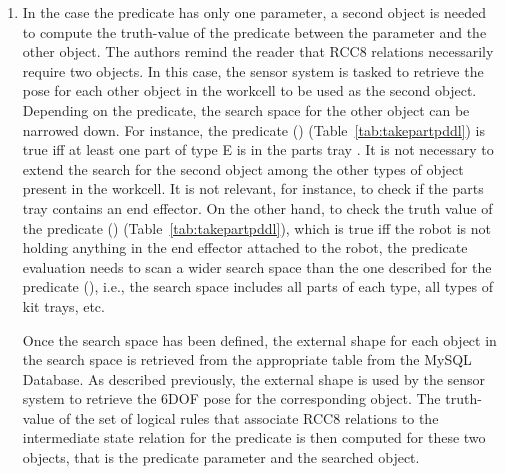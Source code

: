 \begin{enumerate}
\item In the case the predicate has only one parameter, a second object is needed to compute the truth-value of the predicate between the parameter and the other object. The authors remind the reader that RCC8 relations necessarily require two objects. In this case, the sensor system is tasked to retrieve the pose for each other object in the workcell to be used as the second object. Depending on the predicate, the search space for the other object can be narrowed down. For instance, the predicate () (Table~\ref{tab:takepartpddl}) is true iff at least one part of type E is in the parts tray . It is not necessary to extend the search for the second object among the other types of object present in the workcell. It is not relevant, for instance, to check if the parts tray contains an end effector. On the other hand, to check the truth value of the predicate () (Table~\ref{tab:takepartpddl}), which is true iff the robot  is not holding anything in the end effector attached to the robot, the predicate evaluation needs to scan a wider search space than the one described for the predicate (), i.e., the search space includes all parts of each type, all types of kit trays, etc.

Once the search space has been defined, the external shape for each object in the search space is retrieved from the appropriate table from the \textsf{MySQL Database}. As described previously, the external shape is used by the sensor system to retrieve the 6DOF pose for the corresponding object. The truth-value of the set of logical rules that associate RCC8 relations to the intermediate state relation for the predicate is then computed for these two objects, that is the predicate parameter and the searched object.
%


\end{enumerate}
